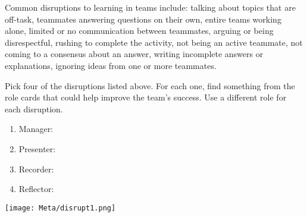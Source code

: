 

Common disruptions to learning in teams include:
  talking about topics that are off-task,
  teammates answering questions on their own,
  entire teams working alone,
  limited or no communication between teammates,
  arguing or being disrespectful,
  rushing to complete the activity,
  not being an active teammate,
  not coming to a consensus about an answer,
  writing incomplete answers or explanations,
  ignoring ideas from one or more teammates.




\Q Pick four of the disruptions listed above.
For each one, find something from the role cards that could help improve the team's success.
Use a different role for each disruption.

\begin{enumerate}
\item Manager: 
\vspace{2em}
\item Presenter: 
\vspace{2em}
\item Recorder: 
\vspace{2em}
\item Reflector: 
\vspace{2em}
\end{enumerate}

\begin{center}
\texttt{[image: Meta/disrupt1.png]}
\end{center}
